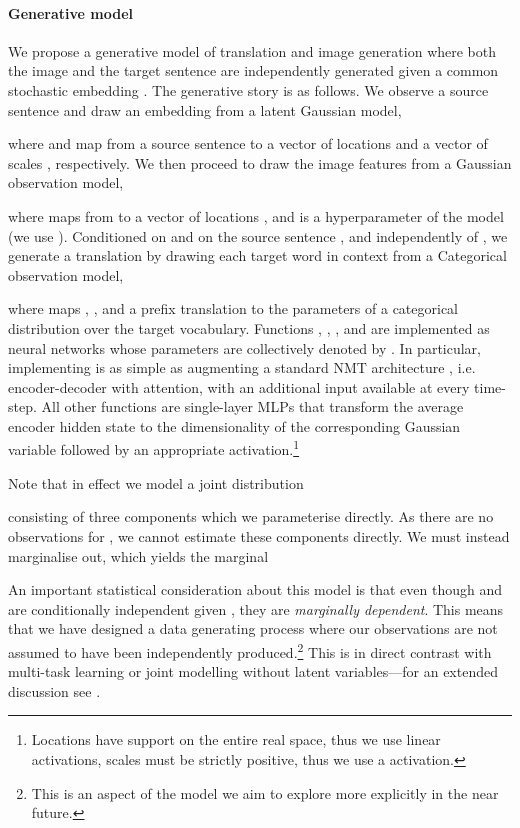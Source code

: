 \documentclass[11pt,a4paper]{article}
\begin{document}
\paragraph{Generative model} We propose a generative model of translation and image generation where both the image  and the target sentence  are independently generated given a common stochastic embedding . 
The generative story is as follows.
We observe a source sentence  and draw an embedding  from a latent Gaussian model, 

where  and  map from a source sentence to a vector of locations  and a vector of scales , respectively.
We then proceed to draw the image features from a Gaussian observation model,

where  maps from  to a vector of locations , and  is a hyperparameter of the model (we use ).
Conditioned on  and on the source sentence , and independently of , we generate a translation by drawing each target word in context from a Categorical observation model,

where  maps , , and a prefix translation  to the parameters  of a categorical distribution over the target vocabulary.
Functions , , , and  are implemented as neural networks whose parameters are collectively denoted by . In particular, implementing  is as simple as augmenting a standard NMT architecture \citep{BahdanauChoBengio2015,Luongetal2015}, i.e. encoder-decoder with attention, with an additional input  available at every time-step. All other functions are single-layer MLPs that transform the average encoder hidden state to the dimensionality of the corresponding Gaussian variable followed by an appropriate activation.\footnote{Locations have support on the entire real space, thus we use linear activations, scales must be strictly positive, thus we use a  activation.} 

Note that in effect we model a joint distribution 

consisting of three components which we parameterise directly.
As there are no observations for , we cannot estimate these components directly.
We must instead marginalise  out, which yields the marginal

An important statistical consideration about this model is that even though  and  are conditionally independent given , they are \emph{marginally dependent}. 
This means that we have designed a data generating process where our observations  are not assumed to have been independently produced.\footnote{This is an aspect of the model we aim to explore more explicitly in the near future.}
This is in direct contrast with multi-task learning or joint modelling without latent variables---for an extended discussion see \citep[\S~3]{eikema2018auto}.
\end{document}
